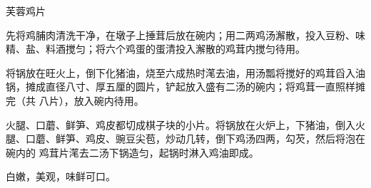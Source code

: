 %
%
%
%
%
%
%
\begin{recipe}{芙蓉鸡片}

\ingredients


\preparation

\step 先将鸡脯肉清洗干净，在墩子上捶茸后放在碗内；用二两鸡汤澥散，投入豆粉、味
精、盐、料酒搅匀；将六个鸡蛋的蛋清投入澥散的鸡茸内搅匀待用。

\step 将锅放在旺火上，倒下化猪油，烧至六成热时滗去油，用汤瓢将搅好的鸡茸舀入油
锅，摊成直径八寸、厚五厘的圆片，铲起放入盛有二汤的碗内；将鸡茸一直照样摊完（共
八片），放入碗内待用。

\step 火腿、口蘑、鲜笋、鸡皮都切成棋子块的小片。将锅放在火炉上，下猪油，倒入火
腿、口蘑、鲜笋、鸡皮、豌豆尖苞，炒动几转，倒下鸡汤四两，勾芡，然后将泡在碗内的
鸡茸片滗去二汤下锅造匀，起锅时淋入鸡油即成。

\features

白嫩，美观，味鲜可口。

\end{recipe}

